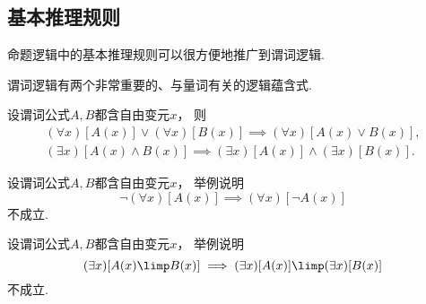 \subsection{基本推理规则}
命题逻辑中的基本推理规则可以很方便地推广到谓词逻辑.

谓词逻辑有两个非常重要的、与量词有关的逻辑蕴含式.
\begin{theorem}\label{theorem:一阶逻辑.基本推理规则}
设谓词公式\(A,B\)都含自由变元\(x\)，
则\begin{gather}
	(\forall x)[A(x)] \lor (\forall x)[B(x)]
	\implies (\forall x)[A(x) \lor B(x)], \\
	(\exists x)[A(x) \land B(x)]
	\implies (\exists x)[A(x)] \land (\exists x)[B(x)].
\end{gather}
\end{theorem}

\begin{example}
设谓词公式\(A,B\)都含自由变元\(x\)，
举例说明\begin{equation*}
	\neg(\forall x)[A(x)] \implies (\forall x)[\neg A(x)]
\end{equation*}不成立.
\end{example}

\begin{example}
设谓词公式\(A,B\)都含自由变元\(x\)，
举例说明\begin{equation*}
	(\exists x)[A(x) \limp B(x)] \implies (\exists x)[A(x)] \limp (\exists x)[B(x)]
\end{equation*}不成立.
\end{example}

